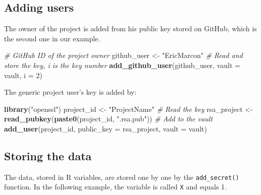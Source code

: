 \documentclass[
  12pt,
  american,
  a4paper,
  extrafontsizes,onecolumn,openright
  ]{memoir}
\newenvironment{Shaded}{\begin{snugshade}}{\end{snugshade}}
\newcommand{\AttributeTok}[1]{\textcolor[rgb]{0.13,0.29,0.53}{#1}}
\newcommand{\CommentTok}[1]{\textcolor[rgb]{0.56,0.35,0.01}{\textit{#1}}}
\newcommand{\DecValTok}[1]{\textcolor[rgb]{0.00,0.00,0.81}{#1}}
\newcommand{\FunctionTok}[1]{\textcolor[rgb]{0.13,0.29,0.53}{\textbf{#1}}}
\newcommand{\NormalTok}[1]{#1}
\newcommand{\OtherTok}[1]{\textcolor[rgb]{0.56,0.35,0.01}{#1}}
\newcommand{\StringTok}[1]{\textcolor[rgb]{0.31,0.60,0.02}{#1}}
\begin{document}
\normalsize

\subsection{Adding users}\label{adding-users}

The owner of the project is added from his public key stored on GitHub, which is the second one in our example.

\scriptsize

\begin{Shaded}
\begin{Highlighting}[]
\CommentTok{\# GitHub ID of the project owner}
\NormalTok{github\_user }\OtherTok{\textless{}{-}} \StringTok{"EricMarcon"}
\CommentTok{\# Read and store the key, i is the key number}
\FunctionTok{add\_github\_user}\NormalTok{(github\_user, }\AttributeTok{vault =}\NormalTok{ vault, }\AttributeTok{i =} \DecValTok{2}\NormalTok{)}
\end{Highlighting}
\end{Shaded}

\normalsize

The generic project user's key is added by:

\scriptsize

\begin{Shaded}
\begin{Highlighting}[]
\FunctionTok{library}\NormalTok{(}\StringTok{"openssl"}\NormalTok{)}
\NormalTok{project\_id }\OtherTok{\textless{}{-}} \StringTok{"ProjectName"}
\CommentTok{\# Read the key}
\NormalTok{rsa\_project }\OtherTok{\textless{}{-}} \FunctionTok{read\_pubkey}\NormalTok{(}\FunctionTok{paste0}\NormalTok{(project\_id, }\StringTok{".rsa.pub"}\NormalTok{))}
\CommentTok{\# Add to the vault}
\FunctionTok{add\_user}\NormalTok{(project\_id, }\AttributeTok{public\_key =}\NormalTok{ rsa\_project, }\AttributeTok{vault =}\NormalTok{ vault)}
\end{Highlighting}
\end{Shaded}

\normalsize

\subsection{Storing the data}\label{storing-the-data}

The data, stored in R variables, are stored one by one by the \texttt{add\_secret()} function.
In the following example, the variable is called \texttt{X} and equals 1.
\end{document}
